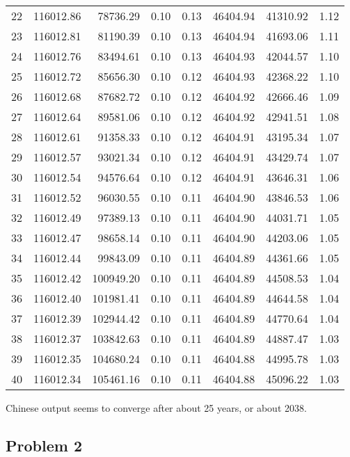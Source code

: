 \documentclass[12pt,letterpaper]{article}
\theoremstyle{definition}
\begin{document}
\begin{table}[p]
\begin{tabular}{lrrrrrrr}
  22 & 116012.86 & 78736.29 & 0.10 & 0.13 & 46404.94 & 41310.92 & 1.12 \\ 
  23 & 116012.81 & 81190.39 & 0.10 & 0.13 & 46404.94 & 41693.06 & 1.11 \\ 
  24 & 116012.76 & 83494.61 & 0.10 & 0.13 & 46404.93 & 42044.57 & 1.10 \\ 
  25 & 116012.72 & 85656.30 & 0.10 & 0.12 & 46404.93 & 42368.22 & 1.10 \\ 
  26 & 116012.68 & 87682.72 & 0.10 & 0.12 & 46404.92 & 42666.46 & 1.09 \\ 
  27 & 116012.64 & 89581.06 & 0.10 & 0.12 & 46404.92 & 42941.51 & 1.08 \\ 
  28 & 116012.61 & 91358.33 & 0.10 & 0.12 & 46404.91 & 43195.34 & 1.07 \\ 
  29 & 116012.57 & 93021.34 & 0.10 & 0.12 & 46404.91 & 43429.74 & 1.07 \\ 
  30 & 116012.54 & 94576.64 & 0.10 & 0.12 & 46404.91 & 43646.31 & 1.06 \\ 
  31 & 116012.52 & 96030.55 & 0.10 & 0.11 & 46404.90 & 43846.53 & 1.06 \\ 
  32 & 116012.49 & 97389.13 & 0.10 & 0.11 & 46404.90 & 44031.71 & 1.05 \\ 
  33 & 116012.47 & 98658.14 & 0.10 & 0.11 & 46404.90 & 44203.06 & 1.05 \\ 
  34 & 116012.44 & 99843.09 & 0.10 & 0.11 & 46404.89 & 44361.66 & 1.05 \\ 
  35 & 116012.42 & 100949.20 & 0.10 & 0.11 & 46404.89 & 44508.53 & 1.04 \\ 
  36 & 116012.40 & 101981.41 & 0.10 & 0.11 & 46404.89 & 44644.58 & 1.04 \\ 
  37 & 116012.39 & 102944.42 & 0.10 & 0.11 & 46404.89 & 44770.64 & 1.04 \\ 
  38 & 116012.37 & 103842.63 & 0.10 & 0.11 & 46404.89 & 44887.47 & 1.03 \\ 
  39 & 116012.35 & 104680.24 & 0.10 & 0.11 & 46404.88 & 44995.78 & 1.03 \\ 
  40 & 116012.34 & 105461.16 & 0.10 & 0.11 & 46404.88 & 45096.22 & 1.03 \\ 
   \hline
\end{tabular}
\end{table}

Chinese output seems to converge after about 25 years, or about 2038.

\break

\subsection*{Problem 2}
\end{document}
